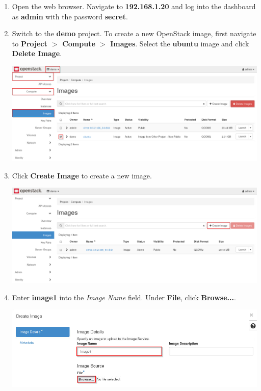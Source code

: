 \documentclass[letterpaper, 12pt]{article}
\begin{document}
\begin{enumerate}
    \item Open the web browser. Navigate to \textbf{192.168.1.20} and log into the dashboard as \textbf{admin} with the
    password \textbf{secret}.

    \item Switch to the \textbf{demo} project. To create a new OpenStack image, first navigate to
    \textbf{Project $>$ Compute $>$ Images}. Select the \textbf{ubuntu} image and click \textbf{Delete Image}.

    \begin{center}
        \includegraphics[width=\linewidth]{images/part1/step2.png}
    \end{center}

    \item Click \textbf{Create Image} to create a new image.

    \begin{center}
        \includegraphics[width=\linewidth]{images/part1/step3.png}
    \end{center}

    \item Enter \textbf{image1} into the \textit{Image Name} field. Under \textbf{File}, click \textbf{Browse...}.
    
    \begin{center}
        \includegraphics[width=\linewidth]{images/part1/step4.png}
    \end{center}


\end{enumerate}
\end{document}
